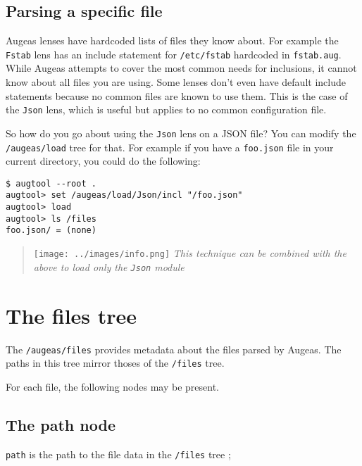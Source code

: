 \subsection{Parsing a specific file}

Augeas lenses have hardcoded lists of files they know about. For example the \verb!Fstab! lens has an include statement for \verb!/etc/fstab! hardcoded in \verb!fstab.aug!. While Augeas attempts to cover the most common needs for inclusions, it cannot know about all files you are using. Some lenses don't even have default include statements because no common files are known to use them. This is the case of the \verb!Json! lens, which is useful but applies to no common configuration file.

So how do you go about using the \verb!Json! lens on a JSON file? You can modify the \verb!/augeas/load! tree for that. For example if you have a \verb!foo.json! file in your current directory, you could do the following:

   

\begin{verbatim}
$ augtool --root .
augtool> set /augeas/load/Json/incl "/foo.json"
augtool> load
augtool> ls /files
foo.json/ = (none)
\end{verbatim}
\begin{quote}
\texttt{[image: ../images/info.png]} \emph{This technique can be combined with the above to load only the \texttt{Json} module}

\end{quote}
\section{The files tree}


The \verb!/augeas/files! provides metadata about the files parsed by Augeas. The paths in this tree mirror thoses of the \verb!/files! tree.

For each file, the following nodes may be present.

\subsection{The path node}

\verb!path! is the path to the file data in the \verb!/files! tree ;

